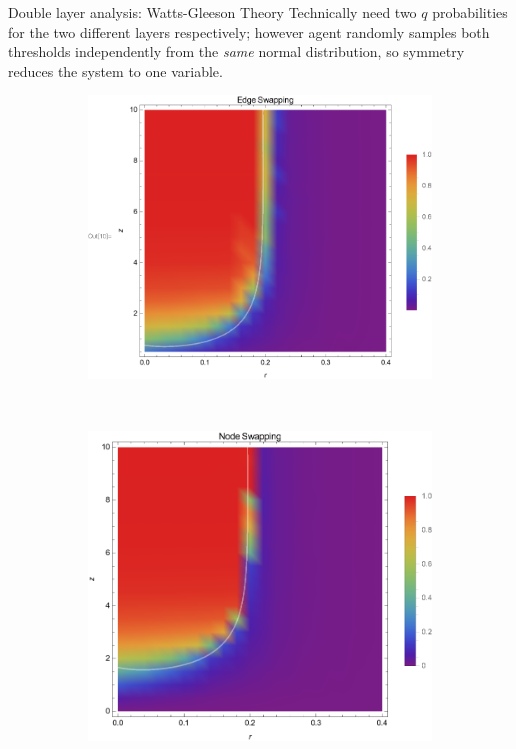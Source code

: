\documentclass[10pt, xcolor=dvipsnames]{beamer}
\begin{document}
\begin{frame}{Double layer analysis: Watts-Gleeson Theory}
Technically need two $q$ probabilities for the two different layers respectively; however agent randomly samples both thresholds independently from the \emph{same} normal distribution, so symmetry reduces the system to one variable.

\begin{figure}
    \centering
    \begin{subfigure}[b]{0.435\textwidth}
        \includegraphics[width=\textwidth]{figures/edge_swap_zr}
    \end{subfigure}
    ~ %
    \begin{subfigure}[b]{0.4\textwidth}
        \includegraphics[width=\textwidth]{figures/node_swap_zr}

\end{subfigure}
\end{figure}
\end{frame}
\end{document}

